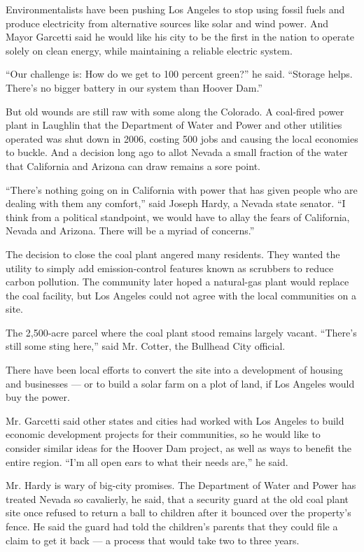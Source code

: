 Environmentalists have been pushing Los Angeles to stop using fossil
fuels and produce electricity from alternative sources like solar and
wind power. And Mayor Garcetti said he would like his city to be the
first in the nation to operate solely on clean energy, while maintaining
a reliable electric system.

``Our challenge is: How do we get to 100 percent green?'' he said.
``Storage helps. There's no bigger battery in our system than Hoover
Dam.''

But old wounds are still raw with some along the Colorado. A coal-fired
power plant in Laughlin that the Department of Water and Power and other
utilities operated was shut down in 2006, costing 500 jobs and causing
the local economies to buckle. And a decision long ago to allot Nevada a
small fraction of the water that California and Arizona can draw remains
a sore point.

``There's nothing going on in California with power that has given
people who are dealing with them any comfort,'' said Joseph Hardy, a
Nevada state senator. ``I think from a political standpoint, we would
have to allay the fears of California, Nevada and Arizona. There will be
a myriad of concerns.''

The decision to close the coal plant angered many residents. They wanted
the utility to simply add emission-control features known as scrubbers
to reduce carbon pollution. The community later hoped a natural-gas
plant would replace the coal facility, but Los Angeles could not agree
with the local communities on a site.

The 2,500-acre parcel where the coal plant stood remains largely vacant.
``There's still some sting here,'' said Mr. Cotter, the Bullhead City
official.

There have been local efforts to convert the site into a development of
housing and businesses --- or to build a solar farm on a plot of land,
if Los Angeles would buy the power.

Mr. Garcetti said other states and cities had worked with Los Angeles to
build economic development projects for their communities, so he would
like to consider similar ideas for the Hoover Dam project, as well as
ways to benefit the entire region. ``I'm all open ears to what their
needs are,'' he said.

Mr. Hardy is wary of big-city promises. The Department of Water and
Power has treated Nevada so cavalierly, he said, that a security guard
at the old coal plant site once refused to return a ball to children
after it bounced over the property's fence. He said the guard had told
the children's parents that they could file a claim to get it back --- a
process that would take two to three years.

